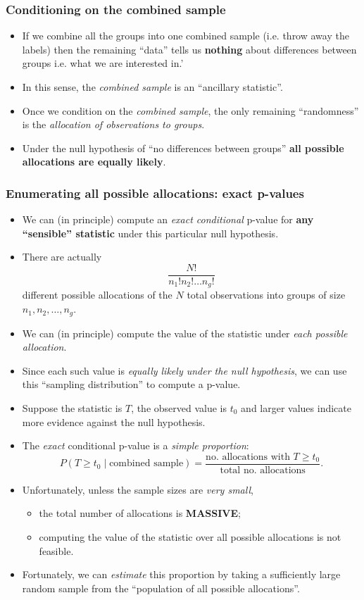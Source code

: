 \documentclass[a4paper]{article}
\begin{document}
\subsubsection{Conditioning on the combined sample}
\begin{itemize}
	\item If we combine all the groups into one combined sample (i.e. throw away the labels) then the remaining ``data'' tells us \textbf{nothing} about differences between groups i.e. what we are interested in.'
	\item In this sense, the \textit{combined sample} is an ``ancillary statistic''.
	\item Once we condition on the \textit{combined sample}, the only remaining ``randomness'' is the \textit{allocation of observations to groups}.
	\item Under the null hypothesis of ``no differences between groups'' \textbf{all possible allocations are equally likely}.
\end{itemize}
\subsubsection{Enumerating all possible allocations: exact p-values}
\begin{itemize}
	\item We can (in principle) compute an \textit{exact conditional} p-value for \textbf{any ``sensible'' statistic} under this particular null hypothesis.
	\item There are actually
	\[
		\frac{N!}{n_1!n_2!\ldots n_g!}
	\]
	different possible allocations of the \( N \) total observations into groups of size \( n_1,n_2,\dotsc,n_g \).
	\item We can (in principle) compute the value of the statistic under \textit{each possible allocation}.
	\item Since each such value is \textit{equally likely under the null hypothesis}, we can use this ``sampling distribution'' to compute a p-value.
	\item Suppose the statistic is \( T \), the observed value is \( t_0 \) and larger values indicate more evidence against the null hypothesis.
	\item The \textit{exact} conditional p-value is a \textit{simple proportion}:
	\[
			P(T\geq t_0 \mid \text{combined sample}) = \frac{\text{no. allocations with }T\geq t_0}{\text{total no. allocations}}.
	\]
	\item Unfortunately, unless the sample sizes are \textit{very small},
	\begin{itemize}
		\item the total number of allocations is \textbf{MASSIVE};
		\item computing the value of the statistic over all possible allocations is not feasible.
	\end{itemize}
	\item Fortunately, we can \textit{estimate} this proportion by taking a sufficiently large random sample from the ``population of all possible allocations''.
\end{itemize}
\end{document}
